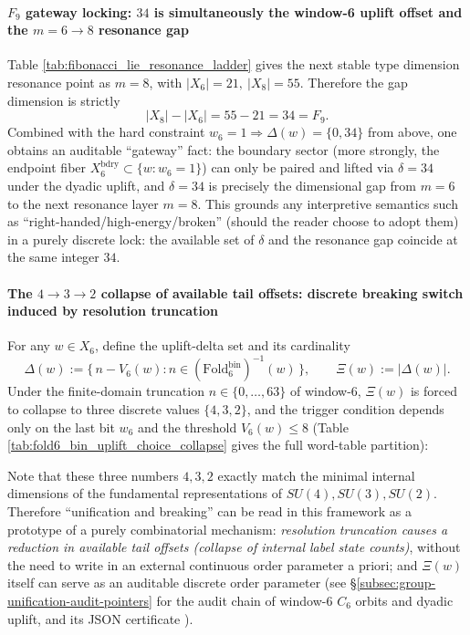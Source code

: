 \paragraph{\texorpdfstring{$F_9$}{F9} gateway locking: \texorpdfstring{$34$}{34} is simultaneously the window-6 uplift offset and the \texorpdfstring{$m=6\to 8$}{m=6->8} resonance gap}
Table \ref{tab:fibonacci_lie_resonance_ladder} gives the next stable type dimension resonance point as \(m=8\), with
\(
|X_6|=21,\ |X_8|=55
\).
Therefore the gap dimension is strictly
\[
|X_8|-|X_6|=55-21=34=F_9.
\]
Combined with the hard constraint \(w_6=1\Rightarrow \Delta(w)=\{0,34\}\) from above, one obtains an auditable ``gateway'' fact:
the boundary sector (more strongly, the endpoint fiber \(X_6^{\mathrm{bdry}}\subset\{w:w_6=1\}\)) can only be paired and lifted via \(\delta=34\) under the dyadic uplift,
and \(\delta=34\) is precisely the dimensional gap from \(m=6\) to the next resonance layer \(m=8\).
This grounds any interpretive semantics such as ``right-handed/high-energy/broken'' (should the reader choose to adopt them) in a purely discrete lock: the available set of \(\delta\) and the resonance gap coincide at the same integer \(34\).

\paragraph{The \texorpdfstring{$4\to 3\to 2$}{4->3->2} collapse of available tail offsets: discrete breaking switch induced by resolution truncation}
For any \(w\in X_6\), define the uplift-delta set and its cardinality
\[
\Delta(w):=\{\,n-V_6(w): n\in (\mathrm{Fold}^{\mathrm{bin}}_6)^{-1}(w)\,\},\qquad
\Xi(w):=|\Delta(w)|.
\]
Under the finite-domain truncation \(n\in\{0,\dots,63\}\) of window-6, \(\Xi(w)\) is forced to collapse to three discrete values \(\{4,3,2\}\), and the trigger condition depends only on the last bit \(w_6\) and the threshold \(V_6(w)\le 8\) (Table \ref{tab:fold6_bin_uplift_choice_collapse} gives the full word-table partition):

\par
Note that these three numbers \(4,3,2\) exactly match the minimal internal dimensions of the fundamental representations of \(SU(4),SU(3),SU(2)\).
Therefore ``unification and breaking'' can be read in this framework as a prototype of a purely combinatorial mechanism: \emph{resolution truncation causes a reduction in available tail offsets (collapse of internal label state counts)},
without the need to write in an external continuous order parameter a priori; and \(\Xi(w)\) itself can serve as an auditable discrete order parameter (see \S\ref{subsec:group-unification-audit-pointers} for the audit chain of window-6 \(C_6\) orbits and dyadic uplift, and its JSON certificate \texttt{}).

